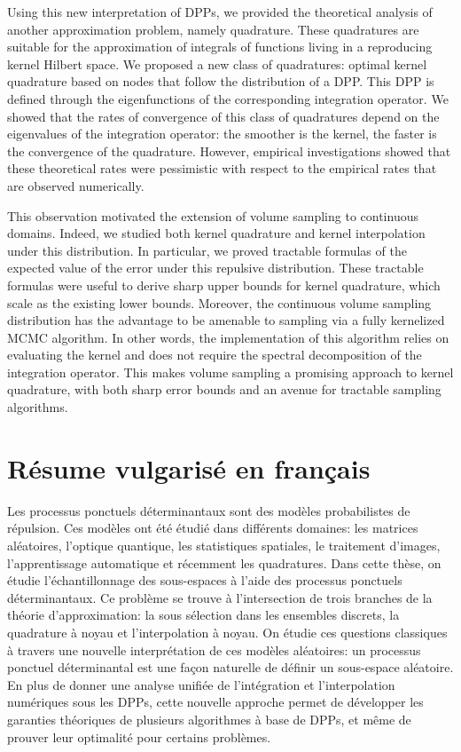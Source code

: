 \documentclass[twoside,11pt]{book}
\numberwithin{theorem}{chapter}
\numberwithin{definition}{chapter}
\numberwithin{proposition}{chapter}
\numberwithin{corollary}{chapter}
\numberwithin{example}{chapter}
\numberwithin{lemma}{chapter}
\numberwithin{assumption}{chapter}
\numberwithin{equation}{chapter}
\numberwithin{figure}{chapter}
\begin{document}
Using this new interpretation of DPPs, we provided the theoretical analysis of another approximation problem, namely quadrature. These quadratures are suitable for the approximation of integrals of functions living in a reproducing kernel Hilbert space. We proposed a new class of quadratures: optimal kernel quadrature based on nodes that follow the distribution of a DPP. This DPP is defined through the eigenfunctions of the corresponding integration operator. We showed that the rates of convergence of this class of quadratures depend on the eigenvalues of the integration operator: the smoother is the kernel, the faster is the convergence of the quadrature. However, empirical investigations showed that these theoretical rates were pessimistic with respect to the empirical rates that are observed numerically.


This observation motivated the extension of volume sampling to continuous domains. Indeed, we studied both kernel quadrature and kernel interpolation under this distribution. In particular, we proved tractable formulas of the expected value of the error under this repulsive distribution. These tractable formulas were useful to derive sharp upper bounds for kernel quadrature, which scale as the existing lower bounds. Moreover, the continuous volume sampling distribution has the advantage to be amenable to sampling via a fully kernelized MCMC algorithm. In other words, the implementation of this algorithm 
relies on evaluating the kernel and
does not require the spectral decomposition of the integration operator. This makes volume sampling a promising approach to kernel quadrature, with both sharp error bounds and an avenue for tractable sampling algorithms.


\section{Résume vulgarisé en français}

Les processus ponctuels déterminantaux sont des modèles probabilistes de répulsion. Ces modèles ont été étudié dans différents domaines: les matrices aléatoires, l’optique quantique, les statistiques spatiales, le traitement d’images, l’apprentissage automatique et récemment les quadratures.
Dans cette thèse, on étudie l’échantillonnage des sous-espaces à l’aide des processus ponctuels déterminantaux. Ce problème se trouve à l’intersection de trois branches de la théorie d’approximation: la sous sélection dans les ensembles discrets, la quadrature à noyau et l’interpolation à noyau. On étudie ces questions classiques à travers une nouvelle interprétation de ces modèles aléatoires: un processus ponctuel déterminantal est une façon naturelle de définir un sous-espace aléatoire. En plus de donner une analyse unifiée de l’intégration et l’interpolation numériques sous les DPPs, cette nouvelle approche permet de développer les garanties théoriques de plusieurs algorithmes à base de DPPs, et même de prouver leur optimalité pour certains problèmes.
\end{document}
